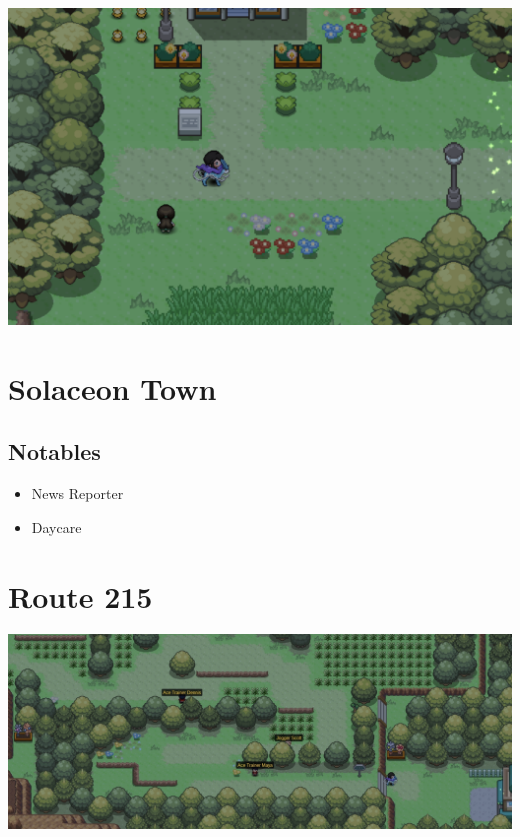 \documentclass[11pt]{article}
\begin{document}
\includegraphics[width=\textwidth]{walkthrough/Sinnoh/Route_210}




\section{Solaceon Town}\label{sec:solaceon-town}

\subsection{Notables}\label{subsec:notables-solaceon-town}

\begin{itemize}
    \item News Reporter
    \item Daycare
\end{itemize}

\section{Route 215}\label{sec:Route_215}

\includegraphics[width=\textwidth]{walkthrough/Sinnoh/Route_215}
\end{document}
